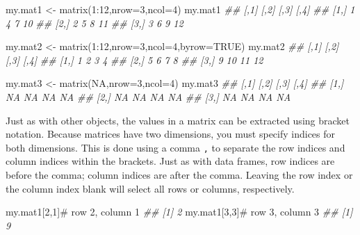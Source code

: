 \documentclass[
  13,
  letterpaper,
]{report}
\newenvironment{Shaded}{\begin{snugshade}}{\end{snugshade}}
\newcommand{\AttributeTok}[1]{\textcolor[rgb]{0.40,0.45,0.13}{#1}}
\newcommand{\CommentTok}[1]{\textcolor[rgb]{0.37,0.37,0.37}{#1}}
\newcommand{\ConstantTok}[1]{\textcolor[rgb]{0.56,0.35,0.01}{#1}}
\newcommand{\DecValTok}[1]{\textcolor[rgb]{0.68,0.00,0.00}{#1}}
\newcommand{\DocumentationTok}[1]{\textcolor[rgb]{0.37,0.37,0.37}{\textit{#1}}}
\newcommand{\FunctionTok}[1]{\textcolor[rgb]{0.28,0.35,0.67}{#1}}
\newcommand{\NormalTok}[1]{\textcolor[rgb]{0.00,0.23,0.31}{#1}}
\newcommand{\OtherTok}[1]{\textcolor[rgb]{0.00,0.23,0.31}{#1}}
\newcommand{\SpecialCharTok}[1]{\textcolor[rgb]{0.37,0.37,0.37}{#1}}
\begin{document}
\begin{Shaded}
\begin{Highlighting}[]
\NormalTok{my.mat1 }\OtherTok{\textless{}{-}} \FunctionTok{matrix}\NormalTok{(}\DecValTok{1}\SpecialCharTok{:}\DecValTok{12}\NormalTok{,}\AttributeTok{nrow=}\DecValTok{3}\NormalTok{,}\AttributeTok{ncol=}\DecValTok{4}\NormalTok{)}
\NormalTok{my.mat1}
\DocumentationTok{\#\#      [,1] [,2] [,3] [,4]}
\DocumentationTok{\#\# [1,]    1    4    7   10}
\DocumentationTok{\#\# [2,]    2    5    8   11}
\DocumentationTok{\#\# [3,]    3    6    9   12}

\NormalTok{my.mat2 }\OtherTok{\textless{}{-}} \FunctionTok{matrix}\NormalTok{(}\DecValTok{1}\SpecialCharTok{:}\DecValTok{12}\NormalTok{,}\AttributeTok{nrow=}\DecValTok{3}\NormalTok{,}\AttributeTok{ncol=}\DecValTok{4}\NormalTok{,}\AttributeTok{byrow=}\ConstantTok{TRUE}\NormalTok{)}
\NormalTok{my.mat2}
\DocumentationTok{\#\#      [,1] [,2] [,3] [,4]}
\DocumentationTok{\#\# [1,]    1    2    3    4}
\DocumentationTok{\#\# [2,]    5    6    7    8}
\DocumentationTok{\#\# [3,]    9   10   11   12}

\NormalTok{my.mat3 }\OtherTok{\textless{}{-}} \FunctionTok{matrix}\NormalTok{(}\ConstantTok{NA}\NormalTok{,}\AttributeTok{nrow=}\DecValTok{3}\NormalTok{,}\AttributeTok{ncol=}\DecValTok{4}\NormalTok{)}
\NormalTok{my.mat3}
\DocumentationTok{\#\#      [,1] [,2] [,3] [,4]}
\DocumentationTok{\#\# [1,]   NA   NA   NA   NA}
\DocumentationTok{\#\# [2,]   NA   NA   NA   NA}
\DocumentationTok{\#\# [3,]   NA   NA   NA   NA}
\end{Highlighting}
\end{Shaded}

Just as with other objects, the values in a matrix can be extracted
using bracket notation. Because matrices have two dimensions, you must
specify indices for both dimensions. This is done using a comma
\texttt{,} to separate the row indices and column indices within the
brackets. Just as with data frames, row indices are before the comma;
column indices are after the comma. Leaving the row index or the column
index blank will select all rows or columns, respectively.

\begin{Shaded}
\begin{Highlighting}[]
\NormalTok{my.mat1[}\DecValTok{2}\NormalTok{,}\DecValTok{1}\NormalTok{]}\CommentTok{\# row 2, column 1}
\DocumentationTok{\#\# [1] 2}
\NormalTok{my.mat1[}\DecValTok{3}\NormalTok{,}\DecValTok{3}\NormalTok{]}\CommentTok{\# row 3, column 3}
\DocumentationTok{\#\# [1] 9}
\end{Highlighting}
\end{Shaded}
\end{document}
